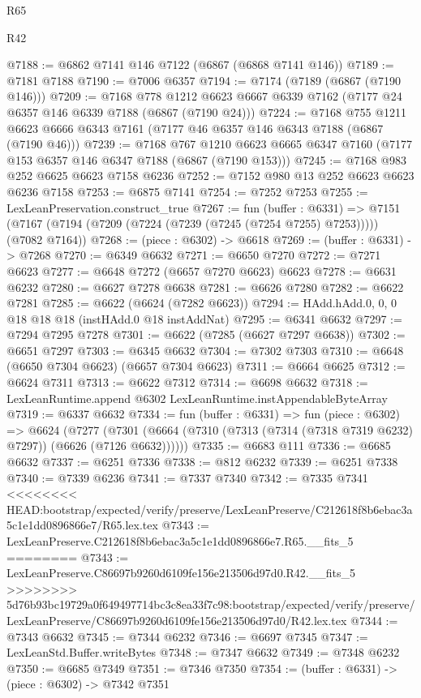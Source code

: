 \begin{lexlean}{R65}
\begin{lexlean}{R42}
\begin{coremodule}
{{{{{{{{{{{{{{{{{{{{{{{{{{{{{{{{{{{{{{{{{{{{{{{{{{{{{{{{{{{{{{{{{{{{{{{{{{{{{{{{{{{{{{{{{{{{{{{{{{{{{{{{{{{{{{{{{{{{{{{{{{{{{{{{{{{{{{{{{{{{{{{{{{{{{{{{{{{{{{{{{{{{{{{{{{{{{{{{{{{{{{{{@7188 := @6862 @7141 @146 @7122 (@6867 (@6868 @7141 @146))
@7189 := @7181 @7188
@7190 := @7006 @6357
@7194 := @7174 (@7189 (@6867 (@7190 @146)))
@7209 := @7168
    @778
    @1212
    @6623
    @6667
    @6339
    @7162
    (@7177 @24 @6357 @146 @6339 @7188 (@6867 (@7190 @24)))
@7224 := @7168
    @755
    @1211
    @6623
    @6666
    @6343
    @7161
    (@7177 @46 @6357 @146 @6343 @7188 (@6867 (@7190 @46)))
@7239 := @7168
    @767
    @1210
    @6623
    @6665
    @6347
    @7160
    (@7177 @153 @6357 @146 @6347 @7188 (@6867 (@7190 @153)))
@7245 := @7168 @983 @252 @6625 @6623 @7158 @6236
@7252 := @7152 @980 @13 @252 @6623 @6623 @6236 @7158
@7253 := @6875 @7141
@7254 := @7252 @7253
@7255 := LexLeanPreservation.construct_true
@7267 := fun (buffer : @6331) =>
  @7151 (@7167 (@7194 (@7209 (@7224 (@7239 (@7245 (@7254 @7255) @7253))))) (@7082 @7164))
@7268 := (piece : @6302) -> @6618
@7269 := (buffer : @6331) -> @7268
@7270 := @6349 @6632
@7271 := @6650 @7270
@7272 := @7271 @6623
@7277 := @6648 @7272 (@6657 @7270 @6623) @6623
@7278 := @6631 @6232
@7280 := @6627 @7278 @6638
@7281 := @6626 @7280
@7282 := @6622 @7281
@7285 := @6622 (@6624 (@7282 @6623))
@7294 := HAdd.hAdd.{0, 0, 0} @18 @18 @18 (instHAdd.{0} @18 instAddNat)
@7295 := @6341 @6632
@7297 := @7294 @7295 @7278
@7301 := @6622 (@7285 (@6627 @7297 @6638))
@7302 := @6651 @7297
@7303 := @6345 @6632
@7304 := @7302 @7303
@7310 := @6648 (@6650 @7304 @6623) (@6657 @7304 @6623)
@7311 := @6664 @6625
@7312 := @6624 @7311
@7313 := @6622 @7312
@7314 := @6698 @6632
@7318 := LexLeanRuntime.append @6302 LexLeanRuntime.instAppendableByteArray
@7319 := @6337 @6632
@7334 := fun (buffer : @6331) =>
  fun (piece : @6302) =>
  @6624
    (@7277 (@7301 (@6664 (@7310 (@7313 (@7314 (@7318 @7319 @6232) @7297)) (@6626 (@7126 @6632))))))
@7335 := @6683 @111
@7336 := @6685 @6632
@7337 := @6251 @7336
@7338 := @812 @6232
@7339 := @6251 @7338
@7340 := @7339 @6236
@7341 := @7337 @7340
@7342 := @7335 @7341
<<<<<<<< HEAD:bootstrap/expected/verify/preserve/LexLeanPreserve/C212618f8b6ebac3a5c1e1dd0896866e7/R65.lex.tex
@7343 := LexLeanPreserve.C212618f8b6ebac3a5c1e1dd0896866e7.R65.__fits_5
========
@7343 := LexLeanPreserve.C86697b9260d6109fe156e213506d97d0.R42.__fits_5
>>>>>>>> 5d76b93bc19729a0f649497714bc3c8ea33f7c98:bootstrap/expected/verify/preserve/LexLeanPreserve/C86697b9260d6109fe156e213506d97d0/R42.lex.tex
@7344 := @7343 @6632
@7345 := @7344 @6232
@7346 := @6697 @7345
@7347 := LexLeanStd.Buffer.writeBytes
@7348 := @7347 @6632
@7349 := @7348 @6232
@7350 := @6685 @7349
@7351 := @7346 @7350
@7354 := (buffer : @6331) -> (piece : @6302) -> @7342 @7351
}}}}}}}}}}}}}}}}}}}}}}}}}}}}}}}}}}}}}}}}}}}}}}}}}}}}}}}}}}}}}}}}}}}}}}}}}}}}}}}}}}}}}}}}}}}}}}}}}}}}}}}}}}}}}}}}}}}}}}}}}}}}}}}}}}}}}}}}}}}}}}}}}}}}}}}}}}}}}}}}}}}}}}}}}}}}}}}}}}}}}}}}
\end{coremodule}
\end{lexlean}
\end{lexlean}
